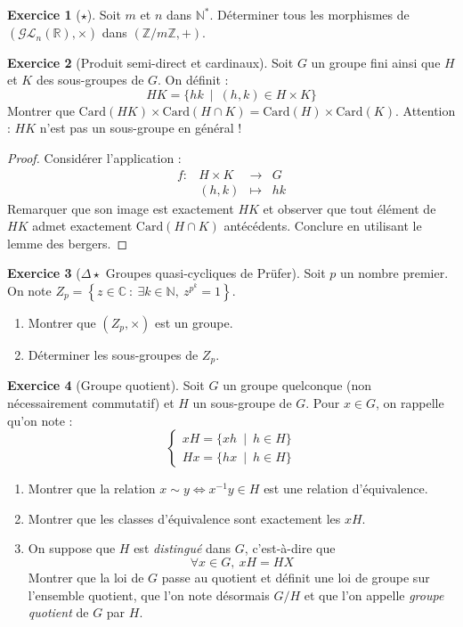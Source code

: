 \documentclass[french]{book}
\newcommand{\N}{\mathbb{N}}
\newcommand{\Z}{\mathbb{Z}}
\newcommand{\R}{\mathbb{R}}
\newcommand{\C}{\mathbb{C}}
\newcommand{\st}{^*}
\newcommand{\inv}{^{-1}}
\newcommand{\card}{\text{Card}}
\theoremstyle{definition}
\newtheorem{ex}{Exercice}[chapter]
\theoremstyle{theorem}
\theoremstyle{remark}
\begin{document}
\begin{ex}[$\star$]
	Soit $m$ et $n$ dans $\N\st$. Déterminer tous les morphismes de $(\mathcal{GL}_n(\R),\times)$ dans $(\Z/m\Z,+)$.
\end{ex}

\begin{ex}[Produit semi-direct et cardinaux]
	Soit $G$ un groupe fini ainsi que $H$ et $K$ des sous-groupes de $G$. On définit : $$HK=\{hk\ \mid \ (h,k)\in H\times K\}$$ Montrer que $\card(HK)\times\card(H\cap K)=\card(H)\times\card(K)$. Attention : $HK$ n'est pas un sous-groupe en général !
\end{ex}

\begin{proof}
	Considérer l'application : $$\begin{array}{lrcl}
		f:&H\times K&\longrightarrow&G \\
		&(h,k)&\longmapsto&hk
	\end{array}$$ Remarquer que son image est exactement $HK$ et observer que tout élément de $HK$ admet exactement $\card(H\cap K)$ antécédents. Conclure en utilisant le lemme des bergers.
\end{proof}

\begin{ex}[$\Delta\star$ Groupes quasi-cycliques de Prüfer]
	Soit $p$ un nombre premier. On note $Z_p=\left\{z\in\C\ : \ \exists k\in\N,\ z^{p^k}=1\right\}$.
	\begin{enumerate}
		\item Montrer que $(Z_p,\times)$ est un groupe.
		\item Déterminer les sous-groupes de $Z_p$.
	\end{enumerate}
\end{ex}

\begin{ex}[Groupe quotient]
	Soit $G$ un groupe quelconque (non nécessairement commutatif) et $H$ un sous-groupe de $G$. Pour $x\in G$, on rappelle qu'on note : $$\begin{cases}
		xH=\{xh\ \mid\ h\in H\}\\
		Hx=\{hx\ \mid\ h\in H\}
	\end{cases}$$
	\begin{enumerate}
		\item Montrer que la relation $x\sim y\iff x\inv y\in H$ est une relation d'équivalence.
		\item Montrer que les classes d'équivalence sont exactement les $xH$.
		\item On suppose que $H$ est \textit{distingué} dans $G$, c'est-à-dire que $$\forall x\in G,\ xH=HX$$ Montrer que la loi de $G$ passe au quotient et définit une loi de groupe sur l'ensemble quotient, que l'on note désormais $G/H$ et que l'on appelle \textit{groupe quotient} de $G$ par $H$.
	\end{enumerate}
\end{ex}
\end{document}
